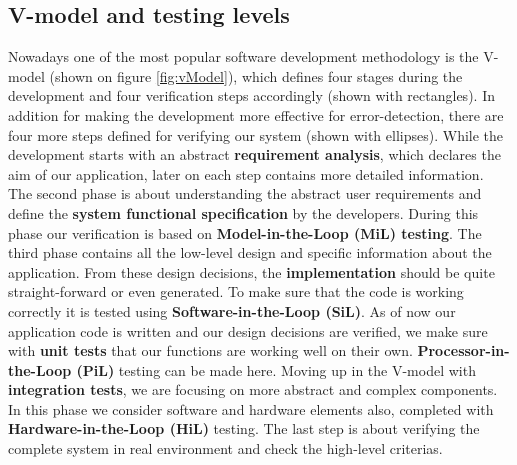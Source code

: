 \subsection{V-model and testing levels}
Nowadays one of the most popular software development methodology is the V-model \cite{Vmodel} (shown on figure \ref{fig:vModel}), which defines four stages during the development and four verification steps accordingly (shown with rectangles). In addition for making the development more effective for error-detection, there are four more steps defined for verifying our system \cite{TestLevels} (shown with ellipses). While the development starts with an abstract \textbf{requirement analysis}, which declares the aim of our application, later on each step contains more detailed information. The second phase is about understanding the abstract user requirements and define the \textbf{system functional specification} by the developers. During this phase our verification is based on \textbf{Model-in-the-Loop (MiL) testing}. The third phase contains all the low-level design and specific information about the application. From these design decisions, the \textbf{implementation} should be quite straight-forward or even generated. To make sure that the code is working correctly it is tested using \textbf{Software-in-the-Loop (SiL)}. 
As of now our application code is written and our design decisions are verified, we make sure with \textbf{unit tests} that our functions are working well on their own. \textbf{Processor-in-the-Loop (PiL)} testing can be made here. Moving up in the V-model with \textbf{integration tests}, we are focusing on more abstract and complex components. In this phase we consider software and hardware elements also, completed with \textbf{Hardware-in-the-Loop (HiL)} testing. The last step is about verifying the complete system in real environment and check the high-level criterias.


